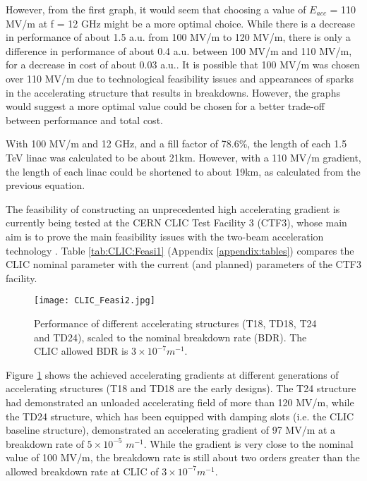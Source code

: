 However, from the first graph, it would seem that choosing a value of $E_{acc}$ = 110 MV/m at f = 12 GHz might be a more optimal choice. While there is a decrease in performance of about 1.5 a.u. from 100 MV/m to 120 MV/m, there is only a difference in performance of about 0.4 a.u. between 100 MV/m and 110 MV/m, for a decrease in cost of about 0.03 a.u.. It is possible that 100 MV/m was chosen over 110 MV/m due to technological feasibility issues and appearances of sparks in the accelerating structure that results in breakdowns. However, the graphs would suggest a more optimal value could be chosen for a better trade-off between performance and total cost.

With 100 MV/m and 12 GHz, and a fill factor of 78.6\%, the length of each 1.5 TeV linac was calculated to be about 21km. However, with a 110 MV/m gradient, the length of each linac could be shortened to about 19km, as calculated from the previous equation.

The feasibility of constructing an unprecedented high accelerating gradient is currently being tested at the CERN CLIC Test Facility 3 (CTF3), whose main aim is to prove the main feasibility issues with the two-beam acceleration technology \cite{Nuclear:CTF3}. Table \ref{tab:CLIC:Feasi1} (Appendix \ref{appendix:tables}) compares the CLIC nominal parameter with the current (and planned) parameters of the CTF3 facility.

\begin{figure}[!htb]
    \centering
    \texttt{[image: CLIC\_Feasi2.jpg]}
    
    \caption{Performance of different accelerating structures (T18, TD18, T24 and TD24), scaled to the nominal breakdown rate (BDR). The CLIC allowed BDR is $3 \times 10^{-7} m^{-1}$. \cite{ICFA:BeamDynPress}}
    \label{fig:CLIC:Feasi2}
\end{figure} %

Figure \ref{fig:CLIC:Feasi2} shows the achieved accelerating gradients at different generations of accelerating structures (T18 and TD18 are the early designs). The T24 structure had demonstrated an unloaded accelerating field of more than 120 MV/m, while the TD24 structure, which has been equipped with damping slots (i.e. the CLIC baseline structure), demonstrated an accelerating gradient of 97 MV/m at a breakdown rate of $5 \times 10^{-5}$ $m^{-1}$. While the gradient is very close to the nominal value of 100 MV/m, the breakdown rate is still about two orders greater than the allowed breakdown rate at CLIC of $3 \times 10^{-7} m^{-1}$.

